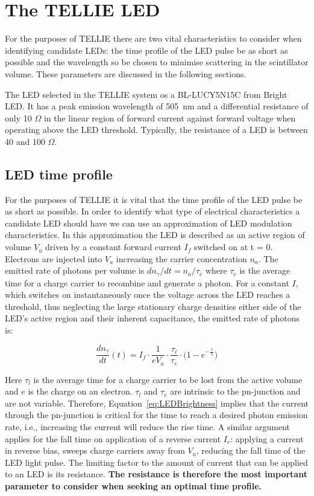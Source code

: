 \documentclass[12pt]{report}
\begin{document}
\section{The TELLIE LED}
\label{sec:LEDcoupling}

For the purposes of TELLIE there are two vital characteristics to consider when identifying candidate LEDs: the time profile of the LED pulse be as short as possible and the wavelength so be chosen to minimise scattering in the scintillator volume. These parameters are discussed in the following sections. 

The LED selected in the TELLIE system os a BL-LUCY5N15C from Bright LED. It has a peak emission wavelength of 505~nm and a differential resistance of only 10 $\Omega$ in the linear region of forward current against forward voltage when operating above the LED threshold. Typically, the resistance of a LED is between 40 and 100 $\Omega$. 

\subsection{LED time profile}

For the purposes of TELLIE it is vital that the time profile of the LED pulse be as short as possible. In order to identify what type of electrical characteristics a candidate LED should have we can use an approximation of LED modulation characteristics. In this approximation the LED is described as an active region of volume $V_a$ driven by a constant forward current $I_f$ switched on at t = 0. Electrons are injected into $V_a$ increasing the carrier concentration $n_a$. The emitted rate of photons per volume is $dn_{\gamma}/dt = n_a/\tau_e$ where $\tau_e$ is the average time for a charge carrier to recombine and generate a photon. For a constant $I$, which switches on instantaneously once the voltage across the LED reaches a threshold, thus neglecting the large stationary charge densities either side of the LED's active region and their inherent capacitance, the emitted rate of photons is: 

\begin{equation}
\frac{dn_\gamma}{dt} (t) = I_f \cdot  \frac{1}{eV_a} \cdot \frac{\tau_l}{\tau_e} \cdot \bigl( 1 - e^{- \frac{t}{\tau_l} } \bigr)
\label{eq:LEDBrightness}
\end{equation}

Here $\tau_l$ is the average time for a charge carrier to be lost from the active volume and $e$ is the charge on an electron. $\tau_l$ and $\tau_e$ are intrinsic to the pn-junction and are not variable. Therefore, Equation~\ref{eq:LEDBrightness} implies that the current through the pn-junction is critical for the time to reach a desired photon emission rate, i.e., increasing the current will reduce the rise time. A similar argument applies for the fall time on application of a reverse current $I_r$: applying a current in reverse bias, sweeps charge carriers away from $V_a$, reducing the fall time of the LED light pulse. The limiting factor to the amount of current that can be applied to an LED is its resistance. \textbf{The resistance is therefore the most important parameter to consider when seeking an optimal time profile.}
\end{document}
